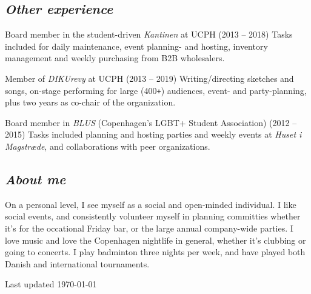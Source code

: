 \documentclass[10pt, a4paper]{article}
\begin{document}
\subsection*{\textit{Other experience}}
\begin{outline}
  \1 Board member in the student-driven \textit{Kantinen} at UCPH (2013 -- 2018)\newline
    {\footnotesize Tasks included for daily maintenance, event planning- and hosting, inventory management and weekly purchasing from B2B wholesalers.}

  \1 Member of \textit{DIKUrevy} at UCPH (2013 -- 2019)\newline
    {\footnotesize Writing/directing sketches and songs, on-stage performing for large (400\texttt{+}) audiences, event- and party-planning, plus two years as co-chair of the organization.}

  \1 Board member in \textit{BLUS} (Copenhagen's LGBT+ Student Association)  (2012 -- 2015)\newline
    {\footnotesize Tasks included planning and hosting parties and weekly events at \textit{Huset i Magstræde}, and collaborations with peer organizations.}
\end{outline}
\vspace*{\fill}
\subsection*{\textit{About me}}
On a personal level, I see myself as a social and open-minded individual.
I like social events, and consistently volunteer myself in planning committies whether it's for the occational Friday bar, or the large annual company-wide parties.
I love music and love the Copenhagen nightlife in general, whether it's clubbing or going to concerts.
I play badminton three nights per week, and have played both Danish and international tournaments.
\vspace*{\fill}
\begin{flushright}
  Last updated \today
\end{flushright}
\end{document}
